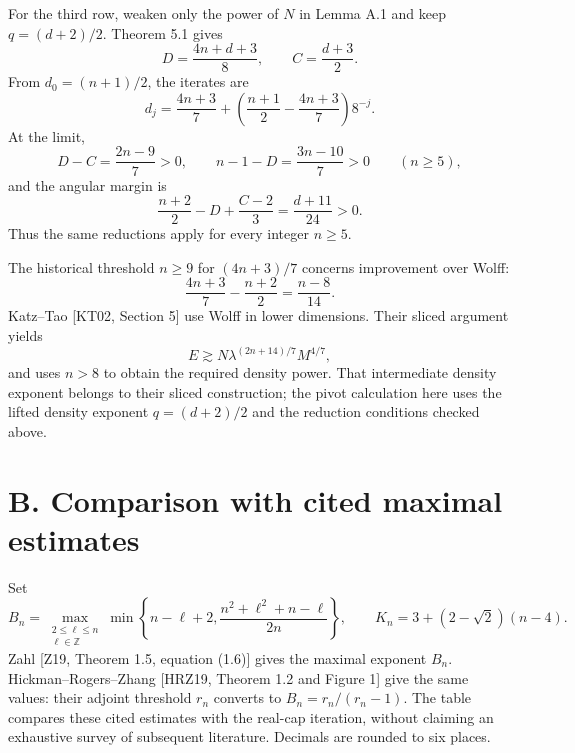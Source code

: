 \documentclass[
  11pt,
  a4paper,
]{article}
\begin{document}
For the third row, weaken only the power of \(N\) in Lemma A.1 and keep
\(q=(d+2)/2\). Theorem 5.1 gives \[
D=\frac{4n+d+3}{8},\qquad C=\frac{d+3}{2}.
\] From \(d_0=(n+1)/2\), the iterates are \[
d_j=\frac{4n+3}{7}
+\left(\frac{n+1}{2}-\frac{4n+3}{7}\right)8^{-j}.
\] At the limit, \[
D-C=\frac{2n-9}{7}>0,
\qquad n-1-D=\frac{3n-10}{7}>0
\qquad(n\ge5),
\] and the angular margin is \[
\frac{n+2}{2}-D+\frac{C-2}{3}
=\frac{d+11}{24}>0.
\] Thus the same reductions apply for every integer \(n\ge5\).

The historical threshold \(n\ge9\) for \((4n+3)/7\) concerns improvement
over Wolff: \[
\frac{4n+3}{7}-\frac{n+2}{2}=\frac{n-8}{14}.
\] Katz--Tao {[}KT02, Section 5{]} use Wolff in lower dimensions. Their
sliced argument yields \[
E\gtrsim N\lambda^{(2n+14)/7}M^{4/7},
\] and uses \(n>8\) to obtain the required density power. That
intermediate density exponent belongs to their sliced construction; the
pivot calculation here uses the lifted density exponent \(q=(d+2)/2\)
and the reduction conditions checked above.

\hypertarget{b.-comparison-with-cited-maximal-estimates}{%
\section{B. Comparison with cited maximal
estimates}\label{b.-comparison-with-cited-maximal-estimates}}

Set \[
 B_n=\max_{\substack{2\le \ell\le n\\ \ell\in\mathbb Z}}\min\left\{
 n-\ell+2,\frac{n^2+\ell^2+n-\ell}{2n}\right\},
 \qquad
 K_n=3+(2-\sqrt2)(n-4).
\] Zahl {[}Z19, Theorem 1.5, equation (1.6){]} gives the maximal
exponent \(B_n\). Hickman--Rogers--Zhang {[}HRZ19, Theorem 1.2 and
Figure 1{]} give the same values: their adjoint threshold \(r_n\)
converts to \(B_n=r_n/(r_n-1)\). The table compares these cited
estimates with the real-cap iteration, without claiming an exhaustive
survey of subsequent literature. Decimals are rounded to six places.
\end{document}
